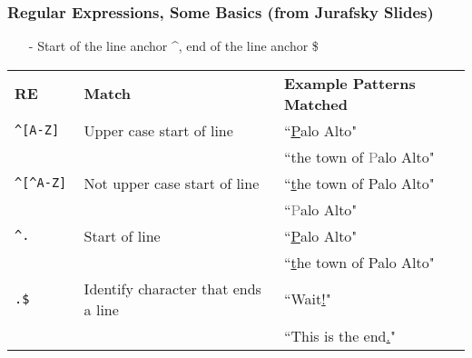 \documentclass{beamer}
\numberwithin{equation}{section}
\begin{document}
\begin{frame}
\frametitle{Regular Expressions, Some Basics (from Jurafsky Slides) } 

\begin{itemize}
\item[-] Start of the line anchor \alert{\^{}}, end of the line anchor \alert{\$}
\end{itemize}


\begin{center}
\begin{tabular}{lll}
\textbf{RE} & \textbf{Match} & \textbf{Example Patterns Matched}\\
{\tt \alert{\^{}}[A-Z] } & Upper case start of line & ``\underline{P}alo Alto" \\
                            &                                                        & ``the town of \textcolor{gray}{P}alo Alto" \\
{\tt \alert{\^{}}[\^{}A-Z] } & Not upper case start of line &      ``\underline{t}he town of Palo Alto" \\
                            &                                                        & ``\textcolor{gray}{P}alo Alto" \\
{\tt \alert{\^{}}.} & Start of line  & ``\underline{P}alo Alto" \\
                            &                                                        & ``\underline{t}he town of Palo Alto" \\
{\tt .\alert{\$} }      & Identify character that ends a line &    ``Wait\alert{\underline{!}}" \\
                              &                                                & ``This is the end\alert{\underline{.}}" \\

 \end{tabular}
 \end{center}                   


\end{frame}
\end{document}
